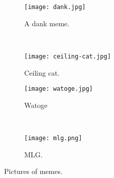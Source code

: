 \begin{figure}[!htbp]
    \centering
    \begin{subfigure}[t]{0.45\textwidth} %
    \texttt{[image: dank.jpg]}
    \caption{A dank meme.}
    \label{f:dankmeme}
    \end{subfigure}
    ~ %
    \begin{subfigure}[b]{0.45\textwidth} %
        \texttt{[image: ceiling-cat.jpg]}
        \caption{Ceiling cat.}
        \label{f:ceilingcat}
    \end{subfigure}

    \begin{subfigure}[c]{0.45\textwidth} %
        \texttt{[image: watoge.jpg]}
        \caption{Watoge}
        \label{f:watoge}
    \end{subfigure}
     ~
    \begin{subfigure}[c]{0.45\textwidth} %
        \texttt{[image: mlg.png]}
        \caption{MLG.}
        \label{f:mlg}
    \end{subfigure}
    \caption{Pictures of memes.}\label{f:memes}
\end{figure}
\FloatBarrier
%
